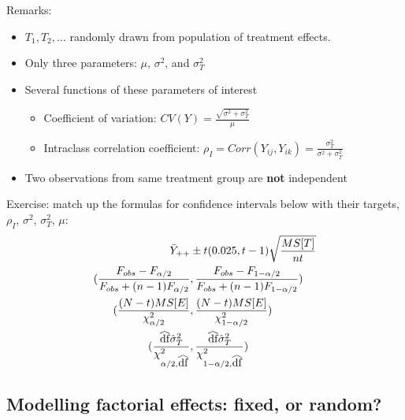 Remarks:
\begin{itemize}
	\item $T_1, T_2, \dots$ randomly drawn from population of treatment effects.
	\item Only three parameters: $\mu$, $\sigma^2$, and $\sigma_T^2$
	\item Several functions of these parameters of interest
	    \begin{itemize}
	    	\item Coefficient of variation: $CV(Y) = \frac{\sqrt{\sigma^2 + \sigma^2_T}}{\mu}$
	    	\item Intraclass correlation coefficient: $\rho_I = Corr(Y_{ij}, Y_{ik}) = \frac{\sigma_T^2}{\sigma^2 + \sigma_T^2}$
	    \end{itemize}
    \item Two observations from same treatment group are {\bf not} independent
\end{itemize}

Exercise: match up the formulas for confidence intervals below with their targets, $\rho_I$, $\sigma^2$, $\sigma_T^2$, $\mu$:
$$
\begin{aligned}
	\bar{Y}_{++} &\pm t(0.025, t - 1) \sqrt{\frac{MS[T]}{nt}}\\
(\frac{F_{{obs}} - F_{\alpha/2}}{F_{{obs}} + (n - 1) F_{\alpha/2}} &,  \frac{F_{{obs}} - F_{1- \alpha/2}}{F_{{obs}} + (n - 1) F_{1 - \alpha/2}} )\\
(\frac{(N - t)MS[E]}{\chi_{\alpha / 2}^2} &, \frac{(N - t)MS[E]}{\chi_{1 - \alpha / 2}^2} )\\
(\frac{\reallywidehat{df} \hat{\sigma}_T^2}{\chi_{\alpha/2, \reallywidehat{df}}^2} &, \frac{\reallywidehat{df} \hat{\sigma}_T^2}{\chi_{1 - \alpha/2, \reallywidehat{df}}^2})\\
\end{aligned}
$$

\newpage
\subsection*{Modelling factorial effects: fixed, or random?}

